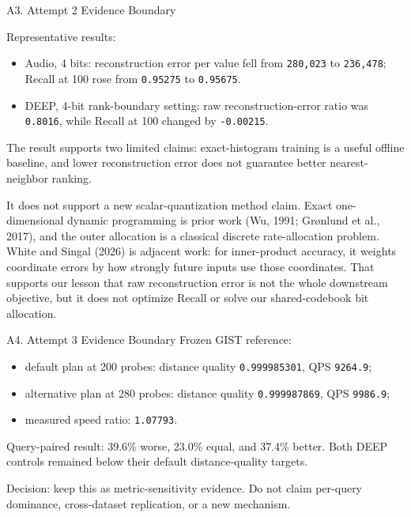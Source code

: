 \documentclass[
  ignorenonframetext,
  aspectratio=169,
]{beamer}
\providecommand{\tightlist}{%
  \setlength{\itemsep}{0pt}\setlength{\parskip}{0pt}}
\begin{document}
\begin{frame}[fragile]{A3. Attempt 2 Evidence Boundary}
\protect{}\label{a3-attempt-2-evidence-boundary}
\small

Representative results:

\begin{itemize}
\tightlist
\item
  Audio, 4 bits: reconstruction error per value fell from
  \texttt{280,023} to \texttt{236,478}; Recall at 100 rose from
  \texttt{0.95275} to \texttt{0.95675}.
\item
  DEEP, 4-bit rank-boundary setting: raw reconstruction-error ratio was
  \texttt{0.8016}, while Recall at 100 changed by \texttt{-0.00215}.
\end{itemize}

The result supports two limited claims: exact-histogram training is a
useful offline baseline, and lower reconstruction error does not
guarantee better nearest-neighbor ranking.

It does not support a new scalar-quantization method claim. Exact
one-dimensional dynamic programming is prior work (Wu, 1991; Grønlund et
al., 2017), and the outer allocation is a classical discrete
rate-allocation problem. White and Singal (2026) is adjacent work: for
inner-product accuracy, it weights coordinate errors by how strongly
future inputs use those coordinates. That supports our lesson that raw
reconstruction error is not the whole downstream objective, but it does
not optimize Recall or solve our shared-codebook bit allocation.

\end{frame}

\begin{frame}[fragile]{A4. Attempt 3 Evidence Boundary}
\protect{}\label{a4-attempt-3-evidence-boundary}
Frozen GIST reference:

\begin{itemize}
\tightlist
\item
  default plan at 200 probes: distance quality \texttt{0.999985301}, QPS
  \texttt{9264.9};
\item
  alternative plan at 280 probes: distance quality \texttt{0.999987869},
  QPS \texttt{9986.9};
\item
  measured speed ratio: \texttt{1.07793}.
\end{itemize}

Query-paired result: 39.6\% worse, 23.0\% equal, and 37.4\% better. Both
DEEP controls remained below their default distance-quality targets.

Decision: keep this as metric-sensitivity evidence. Do not claim
per-query dominance, cross-dataset replication, or a new mechanism.

\end{frame}
\end{document}
